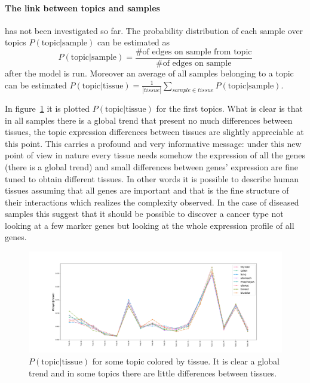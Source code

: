 \FloatBarrier
\paragraph{The link between topics and samples} has not been investigated so far. The probability distribution of each sample over topics $P(\text{topic}| \text{sample})$ can be estimated as \[P(\text{topic}| \text{sample})=\frac{\text{\# of edges on sample from topic}}{\text{\# of edges on sample}}\] after the model is run. Moreover an average of all samples belonging to a topic can be estimated $P(\text{topic}| \text{tissue})=\frac{1}{\left|tissue\right|}\sum_{sample\in tissue}P(\text{topic}| \text{sample})$.

In figure~\ref{fig:topic/merged/lifeplot} it is plotted $P(\text{topic}| \text{tissue})$ for the first topics. What is clear is that in all samples there is a global trend that present no much differences between tissues, the topic expression differences between tissues are slightly appreciable at this point. This carries a profound and very informative message: under this new point of view in nature every tissue needs somehow the expression of all the genes (there is a global trend) and small differences between genes' expression are fine tuned to obtain different tissues. In other words it is possible to describe human tissues assuming that all genes are important and that is the fine structure of their interactions which realizes the complexity observed. In the case of diseased samples this suggest that it should be possible to discover a cancer type not looking at a few marker genes but looking at the whole expression profile of all genes.
\begin{figure}[htb!]
	\centering
	\includegraphics[width=0.8\linewidth]{pictures/topic/merged/lifeplot.pdf}
	\caption{$P(\text{topic} | \text{tissue})$ for some topic colored by tissue. It is clear a global trend and in some topics there are little differences between tissues.}
	\label{fig:topic/merged/lifeplot}
\end{figure}
